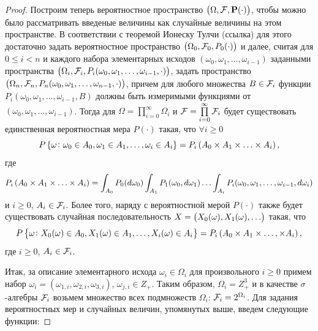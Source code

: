 \documentclass[a4paper,12pt,russian]{extarticle}
\renewcommand{\Pr}{{\mathbf P}}
\begin{document}
\begin{proof}
Построим теперь 	вероятностное пространство $\br{\Omega, {\cal F}, \Pr(\cdot)}$, чтобы можно было рассматривать введеные величины как случайные величины на этом пространстве. В соответствии с теоремой Ионеску Тулчи (ссылка) для этого достаточно задать вероятностное пространство $\left(\Omega_0, {\cal F}_0, P_0(\cdot)\right)$ и далее, считая для $0 \leqslant i < n$ и каждого набора элементарных исходов $(\omega_0, \omega_1, \ldots, \omega_{i-1})$ заданными пространства $\left(\Omega_i, {\cal F}_i, P_i(\omega_0,\omega_1,\ldots, \omega_{i-1},\cdot)\right)$, задать пространство $\left(\Omega_n, {\cal F}_n, P_n(\omega_0,\omega_1,\ldots, \omega_{n-1},\cdot)\right)$, причем для любого множества $B\in {\cal F}_i$ функции $P_i(\omega_0,\omega_1,\ldots, \omega_{i-1},B)$
должны быть измеримыми функциями от $(\omega_0, \omega_1, \ldots, \omega_{i-1})$. Тогда для $\Omega=\prod\limits_{i=0}^{\infty}\Omega_i$ и ${\cal F}=\prod\limits_{i=0}^{\infty} {\cal F}_i$ будет существовать единственная вероятностная мера $P(\cdot)$ такая, что $\forall i \geqslant 0$
\begin{equation*}
P\left\{\omega \colon \omega_0 \in A_0, \omega_1 \in A_1, \ldots, \omega_i\in A_i\right\} = P_i\left(A_0 \times A_1 \times \ldots \times A_i\right),
\end{equation*}
где 
\begin{equation}
 P_i\left(A_0 \times A_1 \times \ldots \times A_i\right) = \int_{A_0} P_0(d \omega_0) \int_{A_1} P_1(\omega_0,d \omega_1) \ldots \int_{A_i} P_i(\omega_0, \omega_1, \ldots, \omega_{i-1}, d \omega_i)
\label{ProbabilitiesGeneralOne}
\end{equation}
и $i\geqslant 0$, $A_i\in {\cal F}_i$. Более того, наряду с вероятностной мерой $P(\cdot)$ также будет существовать случайная последовательность $X=\left(X_0(\omega), X_1(\omega), \ldots\right)$ такая, что
\begin{equation}
P\left\{\omega \colon X_0(\omega) \in A_0, X_1(\omega)\in A_1, \ldots, X_i(\omega)\in A_i\right\} = P_i\left(A_0\times A_1 \times \ldots, \times A_i\right),
\label{ProbabilitiesGeneralTwo}
\end{equation}
где $i\geqslant 0$, $A_i\in {\cal F}_i$.

Итак, за описание элементарного исхода $\omega_i \in \Omega_i$ для произвольного $i \geqslant 0$ примем набор $\omega_i=(\omega_{1,i},\omega_{2,i},\omega_{3,i})$, $\omega_{j,i}\in Z_+$. Таким образом, $\Omega_i=Z_+^3$ и в качестве $\sigma$-алгебры ${\cal F}_i$ возьмем множество всех подмножеств $\Omega_i$: ${\cal F}_i=2^{\Omega_i}$. Для задания вероятностных мер и случайных величин, упомянутых выше, введем следующие функции:


\end{proof}
\end{document}
